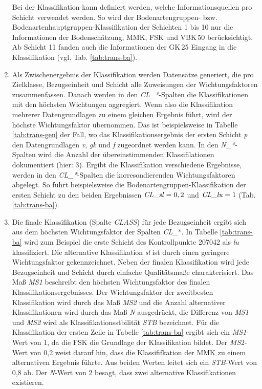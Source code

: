 \begin{enumerate}
Bei der Klassifikation kann definiert werden, welche Informationsquellen pro Schicht verwendet werden. So wird der Bodenartengruppen- bzw. Bodenartenhauptgruppen-Klassifikation der Schichten 1 bis 10 nur die Informationen der Bodenschätzung, MMK, FSK und VBK\,50 berücksichtigt. Ab Schicht 11 fanden auch die Informationen der GK\,25 Eingang in die Klassifikation (vgl. Tab. \ref{tab:trans-ba}).

\item Als Zwischenergebnis der  Klassifikation werden Datensätze generiert, die pro Zielklasse, Bezugseinheit und Schicht alle Zuweisungen der Wichtungsfaktoren zusammenfassen. Danach werden in den \textit{CL\_*}-Spalten die Klassifikationen mit den höchsten Wichtungen aggregiert. Wenn also die Klassifikation mehrerer Datengrundlagen zu einem gleichen Ergebnis führt, wird der höchste Wichtungsfaktor übernommen. Das ist beispielsweise in Tabelle \ref{tab:trans-gen} der Fall, wo das Klassifikationsergebnis der ersten Schicht \textit{p} den Datengrundlagen \textit{v}, \textit{gk} und \textit{f} zugeordnet werden kann. In den \textit{N\_*}-Spalten wird die Anzahl der übereinstimmenden Klassifilationen dokumentiert (hier: 3). Ergibt die Klassifikation verschiedene Ergebnisse, werden in den \textit{CL\_*}-Spalten die korresondierenden Wichtungsfaktoren abgelegt. So führt beispielsweise die Bodenartengruppen-Klassifikation der ersten Schicht zu den beiden Ergebnissen  $\text{\textit{CL\_sl}}=0,2$  und $\text{\textit{CL\_lu}}=1$ (Tab. \ref{tab:trans-ba}).

\item Die finale Klassifikation (Spalte \textit{CLASS}) für jede Bezugseinheit ergibt sich aus dem höchsten Wichtungsfaktor der Spalten \textit{CL\_}*. In Tabelle \ref{tab:trans-ba} wird zum Beispiel die erste Schicht des Kontrollpunkte 207042 als \textit{lu} klassifiziert. Die alternative Klassifikation \textit{sl} ist durch einen geringere Wichtungsfaktor gekennzeichnet.\newline
Neben der finalen Klassifikation wird jede Bezugseinheit und Schicht durch einfache Qualitätsmaße charakterisiert.  Das Maß \textit{MS1} beschreibt den höchsten Wichtungsfaktor des finalen Klassifikationsergebnisses. Der Wichtungsfaktor der zweitbesten Klassifikation wird durch das Maß \textit{MS2} und die Anzahl alternativer Klassifikationen wird durch das Maß \textit{N} ausgedrückt, die Differenz von \textit{MS1} und \textit{MS2} wird als Klassifikationsstbilität \textit{STB} bezeichnet. Für die Klassifikation der ersten Zeile in Tabelle \ref{tab:trans-ba} ergibt sich  ein \textit{MS1}-Wert von 1, da die FSK die Grundlage der Klassifikation bildet. Der $MS2$-Wert von 0,2 weist darauf hin, dass die Klassififkation der MMK zu einem alternativen Ergebnis führte. Aus beiden Werten leitet sich ein \textit{STB}-Wert von 0,8 ab. Der \textit{N}-Wert von 2 besagt, dass zwei alternative Klassifikationen existieren.
\end{enumerate}

